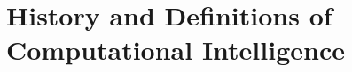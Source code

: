 \chapter{History and Definitions of Computational Intelligence}
\label{chp:history}
\label{chp:definitions}
